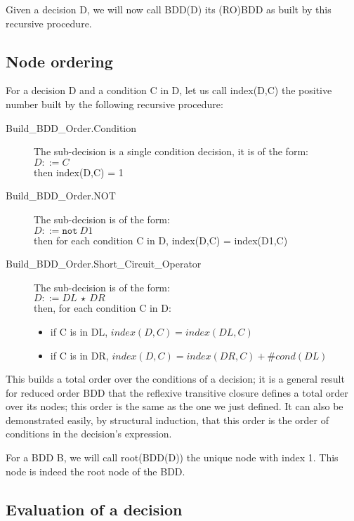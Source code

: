 \documentclass[a4paper,12pt,twoside]{article}
\newcommand{\anysc}{\star}
\newcommand{\adanot}{\texttt{not}}
\begin{document}
Given a decision D, we will now call BDD(D) its (RO)BDD as built by this
recursive procedure.

\subsection{Node ordering}

For a decision D and a condition C in D, let us call index(D,C) the
positive number built by the following recursive procedure:

\begin{description}
\item[Build\_BDD\_Order.Condition]
  The sub-decision is a single condition decision, it is of the form:\\
  $D ::= C$\\
  then index(D,C) = 1\\

\item[Build\_BDD\_Order.NOT]
  The sub-decision is of the form:\\
  $D ::= \adanot{} \ D1$\\
  then for each condition C in D, index(D,C) = index(D1,C)\\

\item[Build\_BDD\_Order.Short\_Circuit\_Operator]
  The sub-decision is of the form:\\
  $D ::= DL \ \anysc{}\ DR$\\
  then, for each condition C in D:\\
  \begin{itemize}
    \item if C is in DL, $index(D,C) = index(DL,C)$
    \item if C is in DR, $index(D,C) = index(DR,C) + \#cond(DL)$
  \end{itemize}
\end{description}

This builds a total order over the conditions of a decision; it is a
general result for reduced order BDD that the reflexive transitive
closure defines a total order over its nodes; this order is the same
as the one we just defined. It can also be demonstrated easily, by
structural induction, that this order is the order of conditions in
the decision's expression.

For a BDD B, we will call root(BDD(D)) the unique node with index 1.
This node is indeed the root node of the BDD.

\subsection{Evaluation of a decision}
\end{document}
